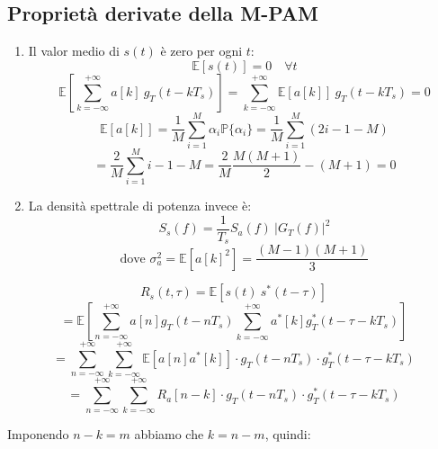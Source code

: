 \subsection*{Proprietà derivate della M-PAM}
\begin{enumerate}
    \item Il valor medio di \( s(t) \) è zero per ogni \( t \):
          \begin{equation*}
              \mathbb{E}\left[ s(t) \right] = 0 \quad \forall t
          \end{equation*}
          \begin{equation*}
              \mathbb{E} \left[ \sum_{k=-\infty}^{+\infty} a[k] \ g_T(t-kT_s) \right] = \sum_{k=-\infty}^{+\infty} \mathbb{E}\left[a[k]\right]\ g_T(t-kT_s) = 0
          \end{equation*}
          \begin{equation*}
              \mathbb{E}\left[a[k]\right] = \frac{1}{M} \sum_{i=1}^{M} \alpha_i \mathbb{P}\{\alpha_i\} = \frac{1}{M} \sum_{i=1}^{M} (2i - 1 - M)
          \end{equation*}
          \begin{equation*}
              = \frac{2}{M} \sum_{i=1}^{M} i - 1 - M = \frac{2}{M} \frac{M(M+1)}{2} - (M+1) = 0
          \end{equation*}

    \item La densità spettrale di potenza invece è:
          \begin{equation*}
              S_s(f) = \frac{1}{T_s} S_a(f) \ |G_T(f)|^2
          \end{equation*}
          \begin{equation*}
              \text{dove } \sigma_a^2 = \mathbb{E}\left[ a\left[k\right]^2 \right] = \frac{(M-1)(M+1)}{3}
          \end{equation*}
\end{enumerate}

\[
    R_s(t,\tau) = \mathbb{E}[s(t) \ s^*(t-\tau)]
\]
\[
    = \mathbb{E} \left[ \sum_{n=-\infty}^{+\infty} a\left[n\right] g_T(t - nT_s) \sum_{k=-\infty}^{+\infty} a^*\left[k\right] g_T^*(t - \tau - kT_s) \right]
\]
\[
    = \sum_{n=-\infty}^{+\infty} \sum_{k=-\infty}^{+\infty} \mathbb{E}[a\left[n\right] a^*\left[k\right]] \cdot g_T(t - nT_s) \cdot g_T^*(t - \tau - kT_s)
\]
\[
    = \sum_{n=-\infty}^{+\infty} \sum_{k=-\infty}^{+\infty} R_a\left[n-k\right] \cdot g_T(t - nT_s) \cdot g_T^*(t - \tau - kT_s)
\]

Imponendo \( n-k = m \) abbiamo che \( k = n-m \), quindi:

